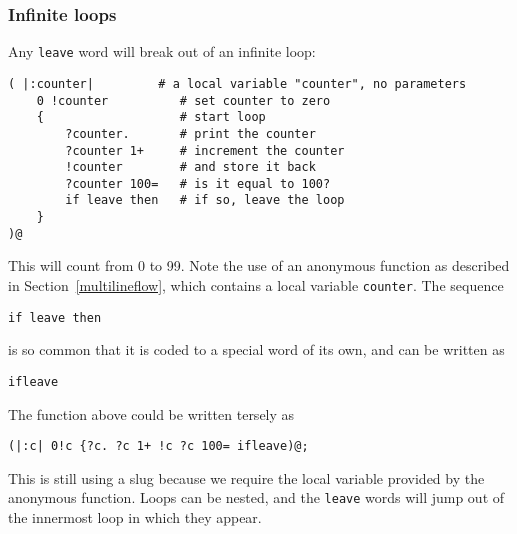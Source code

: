 \subsubsection{Infinite loops}
Any \texttt{leave} word will break out of an infinite loop:
\begin{lstlisting}
( |:counter|         # a local variable "counter", no parameters
    0 !counter          # set counter to zero
    {                   # start loop
        ?counter.       # print the counter
        ?counter 1+     # increment the counter
        !counter        # and store it back
        ?counter 100=   # is it equal to 100?
        if leave then   # if so, leave the loop
    }
)@
\end{lstlisting}
This will count from 0 to 99. Note the use of an anonymous function
as described in Section~\ref{multilineflow}, which contains a local
variable \texttt{counter}.
The sequence
\begin{lstlisting}
if leave then
\end{lstlisting}
is so common that it is coded to a special word of its own, and can be written
as 
\begin{lstlisting}
ifleave
\end{lstlisting}
The function above could be written tersely as
\begin{lstlisting}
(|:c| 0!c {?c. ?c 1+ !c ?c 100= ifleave)@;
\end{lstlisting}
This is still using a slug because we require the local variable
provided by the anonymous function.
Loops can be nested, and the \texttt{leave} words will jump out of the
innermost loop in which they appear.


